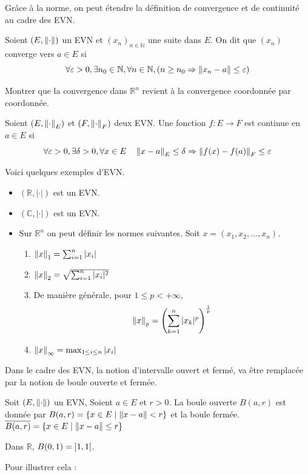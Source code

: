 Grâce à la norme, on peut étendre la définition de convergence et de continuité au cadre des EVN.
\begin{definition}
    Soient $(E,\left\| \cdot \right\|)$ un EVN et $(x_n)_{n\in \mathbb{N}}$ une suite dans $E$. On dit que $(x_n)$ converge vers $a\in E$ si
    \[
    \forall\varepsilon>0,\exists n_0\in \mathbb{N},\forall n\in \mathbb{N}, (n\ge n_0\Rightarrow\left\| x_n-a \right\|\leq\varepsilon)
    \]
\end{definition}
\begin{exercice}
Montrer que la convergence dans $\mathbb{R}^n$ revient à la convergence coordonnée par coordonnée.
\end{exercice}
\begin{definition}
Soient $(E,\left\| \cdot \right\|_E)$ et $(F,\left\| \cdot \right\|_F)$ deux EVN. Une fonction $f:E\to F$ est continue en $a\in E$ si
\[
\forall\varepsilon>0,\exists \delta>0,\forall x\in E \quad \left\| x-a \right\|_E\leq \delta \Rightarrow\left\| f(x)-f(a) \right\|_F\leq \varepsilon
\]
\end{definition}

\begin{exemple}Voici quelques exemples d'EVN.
    \begin{itemize}
        \item $(\mathbb{R},|\cdot|)$ est un EVN.
        \item $(\mathbb{C,|\cdot|})$ est un EVN.
        \item Sur $\mathbb{R}^n$ on peut définir les normes suivantes. Soit $x=(x_1,x_2,...,x_n)$.
        \begin{enumerate}
            \item $\left\| x \right\|_1=\sum_{i=1}^n|x_i|$
            \item $\left\| x \right\|_2=\sqrt{\sum_{i=1}^n|x_i|^2}$
            \item De manière générale, pour $1\leq p<+\infty$,
            $$\left\| x \right\|_p= \left( \sum_{k=1}^n |x_k|^p \right)^ \frac{1}{p}$$
            \item $\left\| x \right\|_\infty=\max_{1\leq i\leq n}|x_i|$
        \end{enumerate}
    \end{itemize}
\end{exemple}

Dans le cadre des EVN, la notion d'intervalle ouvert et fermé, va être remplacée par la notion de boule ouverte et fermée.
\begin{definition}
    Soit $(E,\left\| \cdot \right\|)$ un EVN, Soient $a\in E$ et $r>0$. La boule ouverte $B(a,r)$ est donnée par $B(a,r)=\{x\in E\mid\left\| x-a \right\|<r\}$ et la boule fermée. $\overline{B(a,r)}=\{x\in E \mid \left\| x-a \right\|\leq r\}$
\end{definition}
\begin{exemple}
    Dans $\mathbb{R}$, $B(0,1)=\left] 1,1\right[$.
\end{exemple}
Pour illustrer cela :



